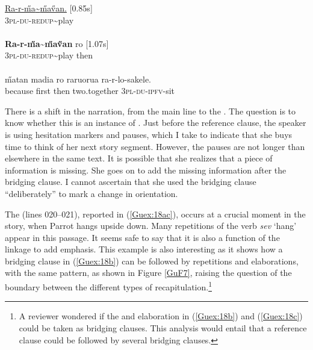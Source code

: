 \documentclass[output=paper]{LSP/langsci}
\begin{document}
\begin{exe}
\ex \label{Guex:17ac}
\begin{xlist}
\ex \label{Guex:17a}
\gll \underline{Ra-r-\H{m}a{\textasciitilde}\H{m}a\H{v}an.}           [0.85s]\\
\textsc{3pl-du-redup}{\textasciitilde}play \\
\glt {}\\
\ex \label{Guex:17b}
\gll \textbf{Ra-r-\H{m}a{\textasciitilde}\H{m}a\H{v}an}              ro [1.07s]\\
\textsc{3pl-du-redup}{\textasciitilde}play   then\\
\glt {}\\
\ex \label{Guex:17c}
\gll   \H{m}atan     madia ro raruorua ra-r-lo-sakele.\\     	       
 because   first then two.together \textsc{3pl-du-ipfv}-sit\\
\glt {} 
\end{xlist}
\end{exe}

There is a shift in the narration, from the main line to the . The question is to know whether this is an instance of . Just before the reference clause, the speaker is using hesitation markers and pauses, which I take to indicate that she buys time to think of her next story segment. However, the pauses are not longer than elsewhere in the same text. It is possible that she realizes that a piece of information is missing. She goes on to add the missing information after the bridging clause. I cannot ascertain that she used the bridging clause ``deliberately'' to mark a change in orientation. 

The  (lines 020--021), reported in (\ref{Guex:18ac}), occurs at a crucial moment in the story, when Parrot hangs upside down. Many repetitions of the verb \textit{sev} `hang' appear in this passage. It seems safe to say that it is also a function of the linkage to add emphasis. This example is also interesting as it shows how a bridging clause in (\ref{Guex:18b}) can be followed by repetitions and elaborations, with the same  pattern, as shown in Figure \ref{GuF7}, raising the question of the boundary between the different types of recapitulation.\footnote{A reviewer wondered if the  and elaboration in (\ref{Guex:18b}) and (\ref{Guex:18c}) could be taken as bridging clauses. This analysis would entail that a reference clause could be followed by several bridging clauses.}
\end{document}
